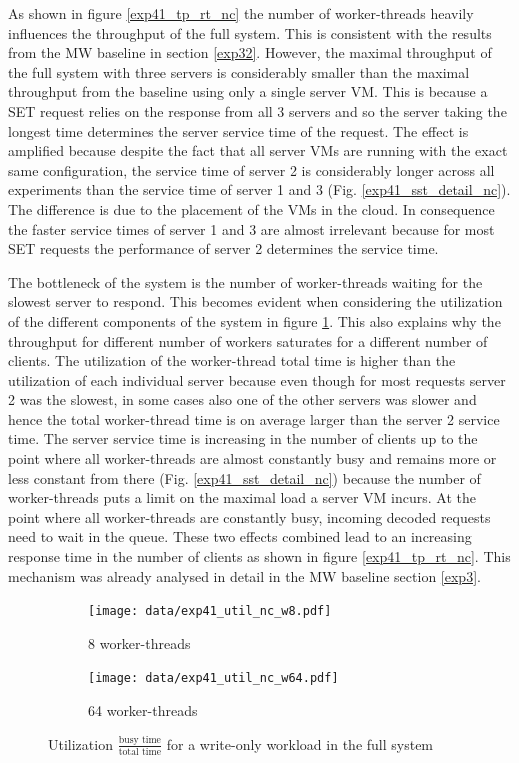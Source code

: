 \documentclass[report.tex]{subfiles}
\begin{document}
As shown in figure \ref{exp41_tp_rt_nc} the number of worker-threads heavily influences the throughput of the full system. This is consistent with the results from the MW baseline in section \ref{exp32}.
However, the maximal throughput of the full system with three servers is considerably smaller than the maximal throughput from the baseline using only a single server VM. This is because a SET request relies on the response from all 3 servers and so the server taking the longest time determines the server service time of the request.
The effect is amplified because despite the fact that all server VMs are running with the exact same configuration, the service time of server 2 is considerably longer across all experiments than the service time of server 1 and 3 (Fig. \ref{exp41_sst_detail_nc}). The difference is due to the placement of the VMs in the cloud. 
In consequence the faster service times of server 1 and 3 are almost irrelevant because for most SET requests the performance of server 2 determines the service time. 

The bottleneck of the system is the number of worker-threads waiting for the slowest server to respond.
This becomes evident when considering the utilization of the different components of the system in figure \ref{exp41_util_nc}. This also explains why the throughput for different number of workers saturates for a different number of clients. The utilization of the worker-thread total time is higher than the utilization of each individual server because even though for most requests server 2 was the slowest, in some cases also one of the other servers was slower and hence the total worker-thread time is on average larger than the server 2 service time.
The server service time is increasing in the number of clients up to the point where all worker-threads are almost constantly busy and remains more or less constant from there (Fig. \ref{exp41_sst_detail_nc}) because the number of worker-threads puts a limit on the maximal load a server VM incurs. At the point where all worker-threads are constantly busy, incoming decoded requests need to wait in the queue. These two effects combined lead to an increasing response time in the number of clients as shown in figure \ref{exp41_tp_rt_nc}. This mechanism was already analysed in detail in the MW baseline section \ref{exp3}.


\begin{figure}[H]
	\begin{subfigure}[b]{.49\linewidth}
		\centering
		\texttt{[image: data/exp41\_util\_nc\_w8.pdf]}
		\caption{8 worker-threads}
	\end{subfigure}\hfill
	\begin{subfigure}[b]{.49\linewidth}
		\centering
		\texttt{[image: data/exp41\_util\_nc\_w64.pdf]}
		\caption{64 worker-threads}
	\end{subfigure}%
	\caption{Utilization $\frac{\text{busy time}}{\text{total time}}$ for a write-only workload in the full system}\label{exp41_util_nc}
\end{figure}
\end{document}
